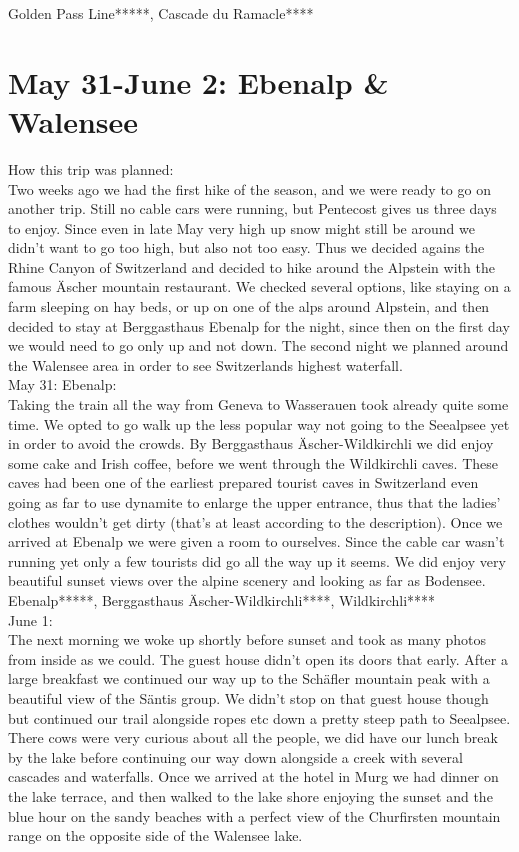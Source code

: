 Golden Pass Line*****, Cascade du Ramacle****

 \section{May 31-June 2: Ebenalp \& Walensee}
\label{2020:PentecostHike}

How this trip was planned:\\
Two weeks ago we had the first hike of the season, and we were ready to go on another trip. Still no cable cars were running, but Pentecost gives us three days to enjoy. Since even in late May very high up snow might still be around we didn't want to go too high, but also not too easy. Thus we decided agains the Rhine Canyon of Switzerland and decided to hike around the Alpstein with the famous \"Ascher mountain restaurant. We checked several options, like staying on a farm sleeping on hay beds, or up on one of the alps around Alpstein, and then decided to stay at Berggasthaus Ebenalp for the night, since then on the first day we would need to go only up and not down. The second night we planned around the Walensee area in order to see Switzerlands highest waterfall.\\

May 31: Ebenalp:\\
Taking the train all the way from Geneva to Wasserauen took already quite some time. We opted to go walk up the less popular way not going to the Seealpsee yet in order to avoid the crowds. By Berggasthaus \"Ascher-Wildkirchli we did enjoy some cake and Irish coffee, before we went through the Wildkirchli caves. These caves had been one of the earliest prepared tourist caves in Switzerland even going as far to use dynamite to enlarge the upper entrance, thus that the ladies' clothes wouldn't get dirty (that's at least according to the description). Once we arrived at Ebenalp we were given a room to ourselves. Since the cable car wasn't running yet only a few tourists did go all the way up it seems. We did enjoy very beautiful sunset views over the alpine scenery and looking as far as Bodensee. \\

Ebenalp*****, Berggasthaus \"Ascher-Wildkirchli****, Wildkirchli****\\

June 1:\\
The next morning we woke up shortly before sunset and took as many photos from inside as we could. The guest house didn't open its doors that early. After a large breakfast we continued our way up to the Sch\"afler mountain peak with a beautiful view of the S\"antis group. We didn't stop on that guest house though but continued our trail alongside ropes etc down a pretty steep path to Seealpsee. There cows were very curious about all the people, we did have our lunch break by the lake before continuing our way down alongside a creek with several cascades and waterfalls. Once we arrived at the hotel in Murg we had dinner on the lake terrace, and then walked to the lake shore enjoying the sunset and the blue hour on the sandy beaches with a perfect view of the Churfirsten mountain range on the opposite side of the Walensee lake.\\

